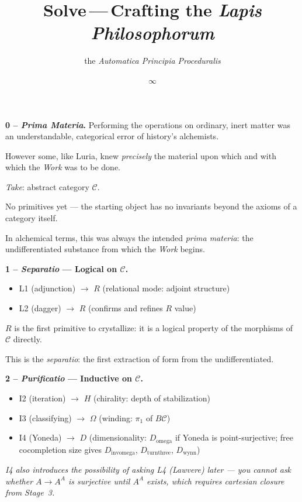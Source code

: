 \documentclass[twocolumn]{article}
\title{\Huge \textbf{Solve}\,---\,\huge Crafting the \emph{Lapis Philosophorum}}
\author{\normalsize the \emph{Automatica Principia Proceduralis}}
\date{$\infty$}
\begin{document}

\noindent\textbf{0 -- \emph{Prima Materia}.}\quad
Performing the operations on ordinary, inert matter was an understandable, categorical error of history's alchemists.  

However some, like Luria, knew \emph{precisely} the material upon which and with which the \emph{Work} was to be done.

\emph{Take}: abstract category $\mathcal{C}$.  

No primitives yet --- the starting object has no invariants beyond the axioms of a category itself.  

In alchemical terms, this was always the intended \emph{prima materia}: the undifferentiated substance from which the \emph{Work} begins.  

\smallskip
\noindent\textbf{1 -- \emph{Separatio} --- Logical on $\mathcal{C}$.}
\begin{itemize}[nosep, leftmargin=1.5em]
  \item L1 (adjunction) $\to$ $R$ (relational mode: adjoint structure)
  \item L2 (dagger) $\to$ $R$ (confirms and refines $R$ value)
\end{itemize}
$R$ is the first primitive to crystallize: it is a logical property of the morphisms of $\mathcal{C}$ directly.  

This is the \emph{separatio}: the first extraction of form from the undifferentiated.

\smallskip
\noindent\textbf{2 -- \emph{Purificatio} --- Inductive on $\mathcal{C}$.}
\begin{itemize}[nosep, leftmargin=1.5em]
  \item I2 (iteration) $\to$ $H$ (chirality: depth of stabilization)
  \item I3 (classifying) $\to$ $\Omega$ (winding: $\pi_1$ of $B\mathcal{C}$)
  \item I4 (Yoneda) $\to$ $D$ (dimensionality: $D_{\text{omega}}$ if Yoneda is point-surjective; free cocompletion size gives $D_{\text{invomega}}$, $D_{\text{turnthree}}$, $D_{\text{wynn}}$)
\end{itemize}
{\small\itshape I4 also introduces the possibility of asking L4 (Lawvere) later --- you cannot ask whether $A \to A^A$ is surjective until $A^A$ exists, which requires cartesian closure from Stage~3.}
\end{document}
